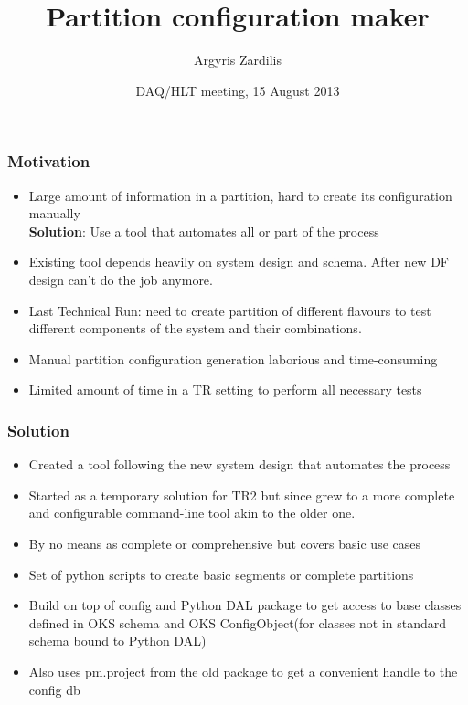 \documentclass{beamer}
\title%
{Partition configuration maker}
\author[Argyris Zardilis] %
{Argyris Zardilis \inst{}}
\institute[Uni Cambridge \& CERN] %
{
  \inst{}%
  University of Cambridge \& CERN
}
\date[DAQ/HLT meeting, 15/08/2013] %
{DAQ/HLT meeting, 15 August 2013}
\begin{document}
\frame{\titlepage}

\begin{frame}
  \frametitle{Motivation}
  \begin{itemize}
    \item Large amount of information in a partition, hard to create its configuration manually \\
      \textbf{Solution}: Use a tool that automates all or part of the process

    \item Existing tool depends heavily on system design and schema. After new DF design can't do the
      job anymore.

    \item Last Technical Run: need to create partition of different flavours to test different components
      of the system and their combinations.

    \item Manual partition configuration generation laborious and time-consuming

    \item Limited amount of time in a TR setting to perform all necessary tests
  \end{itemize}
  
\end{frame}


\begin{frame}
  \frametitle{Solution}
  \begin{itemize}
    \item Created a tool following the new system design that automates the process

    \item Started as a temporary solution for TR2 but since grew to a more complete
      and configurable command-line tool akin to the older one.

    \item By no means as complete or comprehensive but covers basic use cases

    \item Set of python scripts to create basic segments or complete partitions

    \item Build on top of config and Python DAL package to get access to base classes defined in OKS schema and
      OKS ConfigObject(for classes not in standard schema bound to Python DAL)

    \item Also uses pm.project from the old package to get a convenient handle to the config db

  \end{itemize}

\end{frame}
\end{document}

